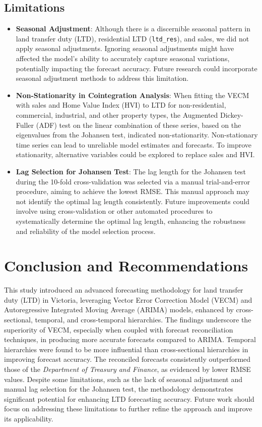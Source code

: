 \documentclass[
  11pt,
  a4paper,
]{article}
\begin{document}
\subsection{Limitations}\label{limitations}

\begin{itemize}
\item
  \textbf{Seasonal Adjustment}: Although there is a discernible seasonal
  pattern in land transfer duty (LTD), residential LTD
  (\texttt{ltd\_res}), and sales, we did not apply seasonal adjustments.
  Ignoring seasonal adjustments might have affected the model's ability
  to accurately capture seasonal variations, potentially impacting the
  forecast accuracy. Future research could incorporate seasonal
  adjustment methods to address this limitation.
\item
  \textbf{Non-Stationarity in Cointegration Analysis}: When fitting the
  VECM with sales and Home Value Index (HVI) to LTD for non-residential,
  commercial, industrial, and other property types, the Augmented
  Dickey-Fuller (ADF) test on the linear combination of these series,
  based on the eigenvalues from the Johansen test, indicated
  non-stationarity. Non-stationary time series can lead to unreliable
  model estimates and forecasts. To improve stationarity, alternative
  variables could be explored to replace sales and HVI.
\item
  \textbf{Lag Selection for Johansen Test}: The lag length for the
  Johansen test during the 10-fold cross-validation was selected via a
  manual trial-and-error procedure, aiming to achieve the lowest RMSE.
  This manual approach may not identify the optimal lag length
  consistently. Future improvements could involve using cross-validation
  or other automated procedures to systematically determine the optimal
  lag length, enhancing the robustness and reliability of the model
  selection process.
\end{itemize}

\section{Conclusion and
Recommendations}\label{conclusion-and-recommendations}

This study introduced an advanced forecasting methodology for land
transfer duty (LTD) in Victoria, leveraging Vector Error Correction
Model (VECM) and Autoregressive Integrated Moving Average (ARIMA)
models, enhanced by cross-sectional, temporal, and cross-temporal
hierarchies. The findings underscore the superiority of VECM, especially
when coupled with forecast reconciliation techniques, in producing more
accurate forecasts compared to ARIMA. Temporal hierarchies were found to
be more influential than cross-sectional hierarchies in improving
forecast accuracy. The reconciled forecasts consistently outperformed
those of the \emph{Department of Treasury and Finance}, as evidenced by
lower RMSE values. Despite some limitations, such as the lack of
seasonal adjustment and manual lag selection for the Johansen test, the
methodology demonstrates significant potential for enhancing LTD
forecasting accuracy. Future work should focus on addressing these
limitations to further refine the approach and improve its
applicability.
\end{document}
